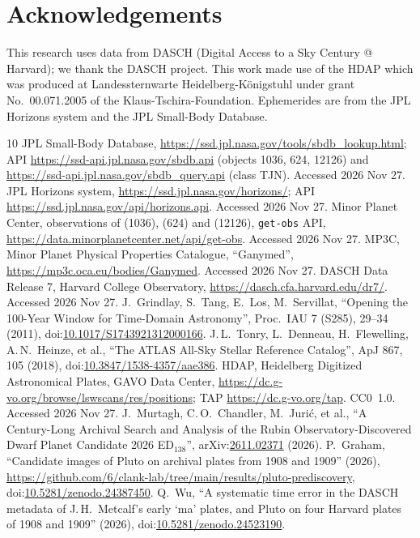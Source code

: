\documentclass[11pt]{article}
\begin{document}
\section*{Acknowledgements}
This research uses data from DASCH (Digital Access to a Sky Century @ Harvard); we thank the DASCH project. This work made use of the HDAP which was produced at Landessternwarte Heidelberg-K\"onigstuhl under grant No.\ 00.071.2005 of the Klaus-Tschira-Foundation. Ephemerides are from the JPL Horizons system and the JPL Small-Body Database.

\begin{thebibliography}{10}
 JPL Small-Body Database, \url{https://ssd.jpl.nasa.gov/tools/sbdb_lookup.html}; API \url{https://ssd-api.jpl.nasa.gov/sbdb.api} (objects 1036, 624, 12126) and \url{https://ssd-api.jpl.nasa.gov/sbdb_query.api} (class TJN). Accessed 2026 Nov 27.
 JPL Horizons system, \url{https://ssd.jpl.nasa.gov/horizons/}; API \url{https://ssd.jpl.nasa.gov/api/horizons.api}. Accessed 2026 Nov 27.
 Minor Planet Center, observations of (1036), (624) and (12126), \texttt{get-obs} API, \url{https://data.minorplanetcenter.net/api/get-obs}. Accessed 2026 Nov 27.
 MP3C, Minor Planet Physical Properties Catalogue, ``Ganymed'', \url{https://mp3c.oca.eu/bodies/Ganymed}. Accessed 2026 Nov 27.
 DASCH Data Release 7, Harvard College Observatory, \url{https://dasch.cfa.harvard.edu/dr7/}. Accessed 2026 Nov 27.
 J.~Grindlay, S.~Tang, E.~Los, M.~Servillat, ``Opening the 100-Year Window for Time-Domain Astronomy'', Proc.\ IAU 7 (S285), 29--34 (2011), doi:\href{https://doi.org/10.1017/S1743921312000166}{10.1017/S1743921312000166}.
 J.\,L.~Tonry, L.~Denneau, H.~Flewelling, A.\,N.~Heinze, et al., ``The ATLAS All-Sky Stellar Reference Catalog'', ApJ 867, 105 (2018), doi:\href{https://doi.org/10.3847/1538-4357/aae386}{10.3847/1538-4357/aae386}.
 HDAP, Heidelberg Digitized Astronomical Plates, GAVO Data Center, \url{https://dc.g-vo.org/browse/lswscans/res/positions}; TAP \url{https://dc.g-vo.org/tap}. CC0~1.0. Accessed 2026 Nov 27.
 J.~Murtagh, C.\,O.~Chandler, M.~Juri\'c, et al., ``A Century-Long Archival Search and Analysis of the Rubin Observatory-Discovered Dwarf Planet Candidate 2026 ED$_{138}$'', arXiv:\href{https://arxiv.org/abs/2611.02371}{2611.02371} (2026).
 P.~Graham, ``Candidate images of Pluto on archival plates from 1908 and 1909'' (2026), \url{https://github.com/6/clank-lab/tree/main/results/pluto-prediscovery}, doi:\href{https://doi.org/10.5281/zenodo.24387450}{10.5281/zenodo.24387450}.
 Q.~Wu, ``A systematic time error in the DASCH metadata of J.\,H.~Metcalf's early `ma' plates, and Pluto on four Harvard plates of 1908 and 1909'' (2026), doi:\href{https://doi.org/10.5281/zenodo.24523190}{10.5281/zenodo.24523190}.
\end{thebibliography}
\end{document}
